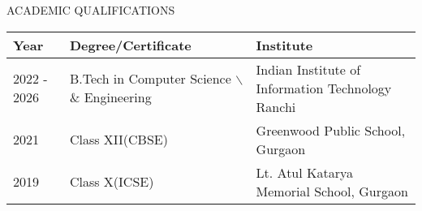 \documentclass{resume} %
\begin{document}
\begin{rSection}{ACADEMIC QUALIFICATIONS}
\def\arraystretch{1.10}
\begin{center}


\begin{table}[!ht]
    \centering
    \begin{tabular}{|l|l|l|}
    \hline
        Year & Degree/Certificate & Institute \\ \hline
        2022 - 2026 & B.Tech in Computer Science $\backslash$\& Engineering & Indian Institute of Information Technology Ranchi \\ \hline
        2021 & Class XII(CBSE) & Greenwood Public School, Gurgaon \\ \hline
        2019 & Class X(ICSE) & Lt. Atul Katarya Memorial School, Gurgaon \\ \hline
    \end{tabular}
\end{table}

\end{center}

\end{rSection}
\end{document}
